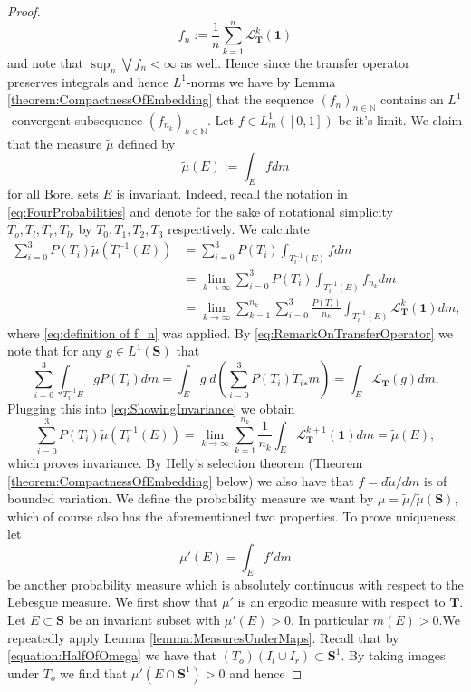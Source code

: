 \documentclass[pdftex,11pt,a4paper,oneside]{article}
\theoremstyle{plain}
\begin{document}
\begin{proof}
\begin{equation}
    f_n:= \frac{1}{n}\sum_{k=1}^n \mathcal{L}_{\mathbf{T}}^k(\mathbf{1})    
\end{equation}
and note that $\sup_n \bigvee f_n<\infty$ as well. Hence since the transfer operator preserves integrals and hence $L^1$-norms we have by Lemma \ref{theorem:CompactnessOfEmbedding} that the sequence $\left(f_n\right)_{n\in\mathbb{N}}$ contains an $L^1$-convergent subsequence $(f_{n_k})_{k\in\mathbb{N}}$. Let $f\in L_m^1([0,1])$ be it's limit. We claim that the measure $\tilde{\mu}$ defined by
\[\tilde{\mu}(E) := \int_E fdm \]
for all Borel sets $E$ is invariant. Indeed, recall the notation in \eqref{eq:FourProbabilities} and denote for the sake of notational simplicity $T_{o},T_l,T_r,T_{lr}$ by $T_0,T_1,T_2,T_3$ respectively. We calculate 
\begin{equation}\label{eq:ShowingInvariance}
    \begin{split}
        \sum_{i=0}^3P(T_i)\tilde{\mu}(T_i^{-1}(E)) &=  \sum_{i=0}^3P(T_i)\int_{T_i^{-1}(E)} fdm\\
        &=\lim_{k\to\infty}\sum_{i=0}^3P(T_i)\int_{T_i^{-1}(E)} f_{n_k}dm\\
        &=\lim_{k\to\infty}    \sum_{k=1}^{n_k}\sum_{i=0}^3\frac{P(T_i)}{n_k}\int_{T_i^{-1}(E)}
 \mathcal{L}_{\mathbf{T}}^k(\mathbf{1}) dm,
    \end{split}
\end{equation}
where \eqref{eq:definition of f_n} was applied. By \eqref{eq:RemarkOnTransferOperator} we note that for any $g\in L^1(\mathbf{S})$ that
\[ \sum_{i=0}^3\int_{T_i^{-1}E} g P(T_i) dm = \int_{E} g \; d\left(\sum_{i=0}^3P(T_i){T_i}_*m\right)= \int_{E}\mathcal{L}_{\mathbf{T}}(g)dm.\]
Plugging this into \eqref{eq:ShowingInvariance} we obtain 
\[\sum_{i=0}^3P(T_i)\tilde{\mu}(T_i^{-1}(E)) =\lim_{k\to\infty}    \sum_{k=1}^{n_k}\frac{1}{n_k}\int_{E}
 \mathcal{L}_{\mathbf{T}}^{k+1}(\mathbf{1}) dm = \tilde{\mu}(E) ,\]
 which proves invariance. By Helly's selection theorem (Theorem \ref{theorem:CompactnessOfEmbedding} below) we also have that $f=d\tilde{\mu}/dm$ is of bounded variation. We define the probability measure we want by $\mu = \tilde{\mu}/\tilde{\mu}(\mathbf{S})$, which of course also has the aforementioned two properties. To prove uniqueness, let 
 \[\mu'(E) = \int_E f' dm\]
 be another probability measure which is absolutely continuous with respect to the Lebesgue measure. We first show that $\mu'$ is an ergodic measure with respect to $\mathbf{T}$. Let $E\subset \mathbf{S}$ be an invariant subset with $\mu'(E)>0$. In particular $m(E)>0$.We repeatedly apply Lemma \ref{lemma:MeasuresUnderMaps}. Recall that by  \eqref{equation:HalfOfOmega} we have that $(T_{o})(I_l\cup I_r)\subset \mathbf{S}^1$.  By taking images under $T_{o}$ we find that $\mu'(E\cap \mathbf{S}^1)>0$ and hence 

\end{proof}
\end{document}
